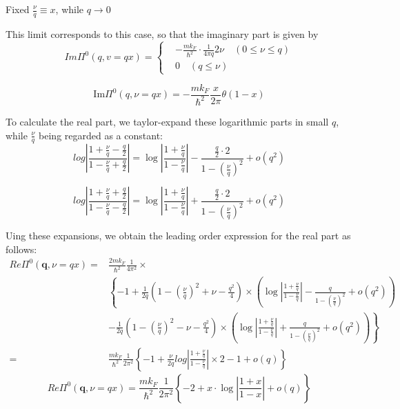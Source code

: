 \begin{itemize}
\begin{center}Fixed $\frac{\nu}{q} \equiv x$, while $q\rightarrow 0$ \end{center}

This limit corresponds to this case, so that the imaginary part is given by
\[ Im\Pi^0(q,v=q x) = \left\{ \begin{split}&-\frac{m k_F}{\hbar^2} \cdot \frac{1}{4\pi q} 2\nu \quad (0\leq \nu \leq q)\\
&0 \quad (q \leq \nu) \end{split} \right. \]

\begin{equation*} \label{Eqs2.8.27.a} \tag{2.8.27.a}
\text{Im} \Pi^0(q,\nu=q x) = -\frac{m k_F}{\hbar^2}\frac{x}{2\pi} \theta(1-x)
\end{equation*}
\setcounter{equation}{27}

To calculate the real part, we taylor-expand these logarithmic parts in small $q$, while $\frac{\nu}{q}$ being regarded as a constant:
\[log\left| \frac{1+\frac{\nu}{q}-\frac{q}{2}}{1-\frac{\nu}{q}+\frac{q}{2}} \right| = \log \left| \frac{1+\frac{\nu}{q}}{1-\frac{\nu}{q}} \right| - \frac{\frac{q}{2}\cdot 2}{1-(\frac{\nu}{q})^2} + o(q^2)\]

\[log\left| \frac{1+\frac{\nu}{q}+\frac{q}{2}}{1-\frac{\nu}{q}-\frac{q}{2}} \right| = \log \left| \frac{1+\frac{\nu}{q}}{1-\frac{\nu}{q}} \right| + \frac{\frac{q}{2}\cdot 2}{1-(\frac{\nu}{q})^2} + o(q^2)\]

Uing these expansions, we obtain the leading order expression for the real part as follows:
\[ \begin{split}Re\Pi^0(\mathbf{q},\nu=q x) =& \frac{2m k_F}{\hbar^2} \frac{1}{4\pi^2} \times\\
&\left\{ -1 + \frac{1}{2q}\left( 1-(\frac{\nu}{q})^2+\nu-\frac{q^2}{4} \right) \times \left( \log \left| \frac{1+\frac{\nu}{q}}{1-\frac{\nu}{q}} \right| - \frac{q}{1-(\frac{\nu}{q})^2} + o(q^2) \right) \right.\\
&\left.-\frac{1}{2q}\left( 1-(\frac{\nu}{q})^2-\nu-\frac{q^2}{4} \right) \times \left( \log \left| \frac{1+\frac{\nu}{q}}{1-\frac{\nu}{q}} \right| + \frac{q}{1-(\frac{\nu}{q})^2} + o(q^2) \right)\right\}\\
=&\frac{m k_F}{\hbar^2} \frac{1}{2\pi^2}\left\{ -1 + \frac{\nu}{2q}log\left| \frac{1+\frac{\nu}{q}}{1-\frac{\nu}{q}} \right| \times 2 - 1 + o(q) \right\}
\end{split}\]
\begin{equation*} \label{Eqs2.8.27.b} \tag{2.8.27.b}
Re\Pi^0(\mathbf{q},\nu=q x)=\frac{m k_F}{\hbar^2} \frac{1}{2\pi^2} \left\{ -2 + x\cdot \log\left| \frac{1+x}{1-x} \right|+ o(q) \right\}
\end{equation*}
\end{itemize}

